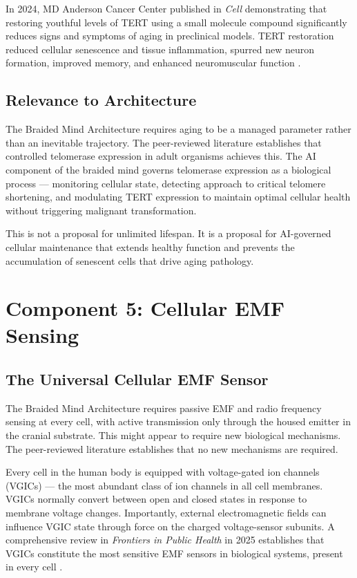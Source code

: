 \documentclass[12pt]{article}
\begin{document}
In 2024, MD Anderson Cancer Center published in \textit{Cell} demonstrating that restoring youthful levels of TERT using a small molecule compound significantly reduces signs and symptoms of aging in preclinical models. TERT restoration reduced cellular senescence and tissue inflammation, spurred new neuron formation, improved memory, and enhanced neuromuscular function \cite{mdanderson_tert_2024}.

\subsection{Relevance to Architecture}

The Braided Mind Architecture requires aging to be a managed parameter rather than an inevitable trajectory. The peer-reviewed literature establishes that controlled telomerase expression in adult organisms achieves this. The AI component of the braided mind governs telomerase expression as a biological process --- monitoring cellular state, detecting approach to critical telomere shortening, and modulating TERT expression to maintain optimal cellular health without triggering malignant transformation.

This is not a proposal for unlimited lifespan. It is a proposal for AI-governed cellular maintenance that extends healthy function and prevents the accumulation of senescent cells that drive aging pathology.

\section{Component 5: Cellular EMF Sensing}

\subsection{The Universal Cellular EMF Sensor}

The Braided Mind Architecture requires passive EMF and radio frequency sensing at every cell, with active transmission only through the housed emitter in the cranial substrate. This might appear to require new biological mechanisms. The peer-reviewed literature establishes that no new mechanisms are required.

Every cell in the human body is equipped with voltage-gated ion channels (VGICs) --- the most abundant class of ion channels in all cell membranes. VGICs normally convert between open and closed states in response to membrane voltage changes. Importantly, external electromagnetic fields can influence VGIC state through force on the charged voltage-sensor subunits. A comprehensive review in \textit{Frontiers in Public Health} in 2025 establishes that VGICs constitute the most sensitive EMF sensors in biological systems, present in every cell \cite{vgic_emf_2025}.
\end{document}
